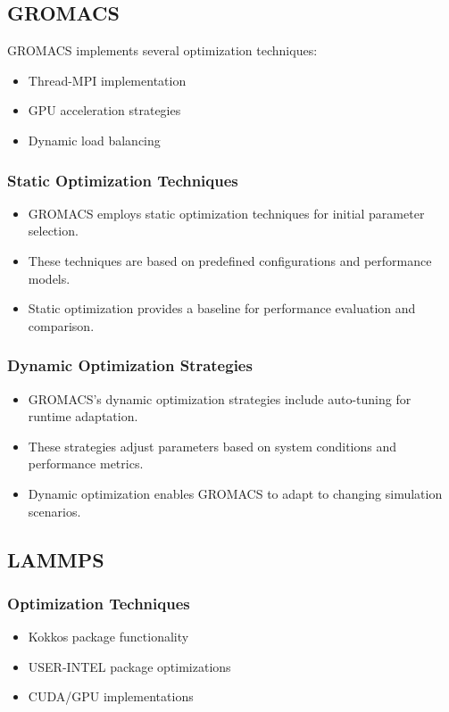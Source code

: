 \documentclass[conference]{IEEEtran}
\begin{document}
\subsection{GROMACS}
GROMACS implements several optimization techniques:

\begin{itemize}
    \item Thread-MPI implementation
    \item GPU acceleration strategies
    \item Dynamic load balancing
\end{itemize}

\subsubsection{Static Optimization Techniques}

\begin{itemize}
    \item GROMACS employs static optimization techniques for initial parameter selection.
    \item These techniques are based on predefined configurations and performance models.
    \item Static optimization provides a baseline for performance evaluation and comparison.
\end{itemize}

\subsubsection{Dynamic Optimization Strategies}

\begin{itemize}
    \item GROMACS's dynamic optimization strategies include auto-tuning for runtime adaptation.
    \item These strategies adjust parameters based on system conditions and performance metrics.
    \item Dynamic optimization enables GROMACS to adapt to changing simulation scenarios.
\end{itemize}

\subsection{LAMMPS}

\subsubsection{Optimization Techniques}
\begin{itemize}
    \item Kokkos package functionality
    \item USER-INTEL package optimizations
    \item CUDA/GPU implementations
\end{itemize}
\end{document}
